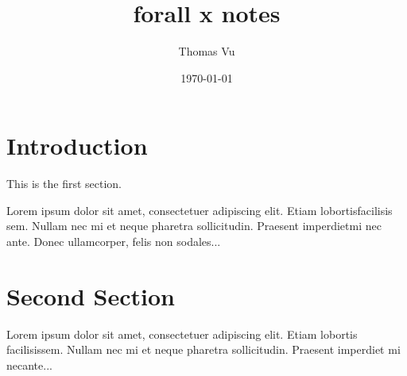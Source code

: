 \documentclass[12pt, letterpaper, twoside]{article}
\title{forall x notes}
\author{Thomas Vu}
\date{\today}
\begin{document}
\maketitle
\newpage
\tableofcontents
\newpage

\section{Introduction}
 
This is the first section.
 
Lorem  ipsum  dolor  sit  amet,  consectetuer  adipiscing  
elit.   Etiam  lobortisfacilisis sem.  Nullam nec mi et 
neque pharetra sollicitudin.  Praesent imperdietmi nec ante. 
Donec ullamcorper, felis non sodales...
 
\section{Second Section}
 
Lorem ipsum dolor sit amet, consectetuer adipiscing elit.  
Etiam lobortis facilisissem.  Nullam nec mi et neque pharetra 
sollicitudin.  Praesent imperdiet mi necante...
 
\end{document}
